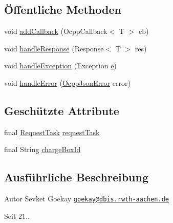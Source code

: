 \subsection*{Öffentliche Methoden}
\begin{DoxyCompactItemize}
\item 
void \hyperlink{classde_1_1rwth_1_1idsg_1_1steve_1_1handler_1_1_abstract_ocpp_response_handler_3_01_t_01_4_a0e9b105abe694aafe78d8823c31876f3}{add\+Callback} (Ocpp\+Callback$<$ T $>$ cb)
\item 
void \hyperlink{classde_1_1rwth_1_1idsg_1_1steve_1_1handler_1_1_abstract_ocpp_response_handler_3_01_t_01_4_a06017636cf97d4a5f1daebe44e940f7e}{handle\+Response} (Response$<$ T $>$ res)
\item 
void \hyperlink{classde_1_1rwth_1_1idsg_1_1steve_1_1handler_1_1_abstract_ocpp_response_handler_3_01_t_01_4_a171ae542fba4f9da7f5a531263a9d7c8}{handle\+Exception} (Exception \hyperlink{jquery-ui_8min_8js_a2c038346d47955cbe2cb91e338edd7e1}{e})
\item 
void \hyperlink{classde_1_1rwth_1_1idsg_1_1steve_1_1handler_1_1_abstract_ocpp_response_handler_3_01_t_01_4_ace2a08be261a858fb0ee9a29dac0d421}{handle\+Error} (\hyperlink{classde_1_1rwth_1_1idsg_1_1steve_1_1ocpp_1_1ws_1_1data_1_1_ocpp_json_error}{Ocpp\+Json\+Error} error)
\end{DoxyCompactItemize}
\subsection*{Geschützte Attribute}
\begin{DoxyCompactItemize}
\item 
final \hyperlink{classde_1_1rwth_1_1idsg_1_1steve_1_1web_1_1dto_1_1task_1_1_request_task}{Request\+Task} \hyperlink{classde_1_1rwth_1_1idsg_1_1steve_1_1handler_1_1_abstract_ocpp_response_handler_3_01_t_01_4_afbad6820ded6580e25792d7a4b893465}{request\+Task}
\item 
final String \hyperlink{classde_1_1rwth_1_1idsg_1_1steve_1_1handler_1_1_abstract_ocpp_response_handler_3_01_t_01_4_a8c07bdb598803efe236906c96a8d21a6}{charge\+Box\+Id}
\end{DoxyCompactItemize}


\subsection{Ausführliche Beschreibung}
\begin{DoxyAuthor}{Autor}
Sevket Goekay \href{mailto:goekay@dbis.rwth-aachen.de}{\tt goekay@dbis.\+rwth-\/aachen.\+de} 
\end{DoxyAuthor}
\begin{DoxySince}{Seit}
21.. 
\end{DoxySince}


